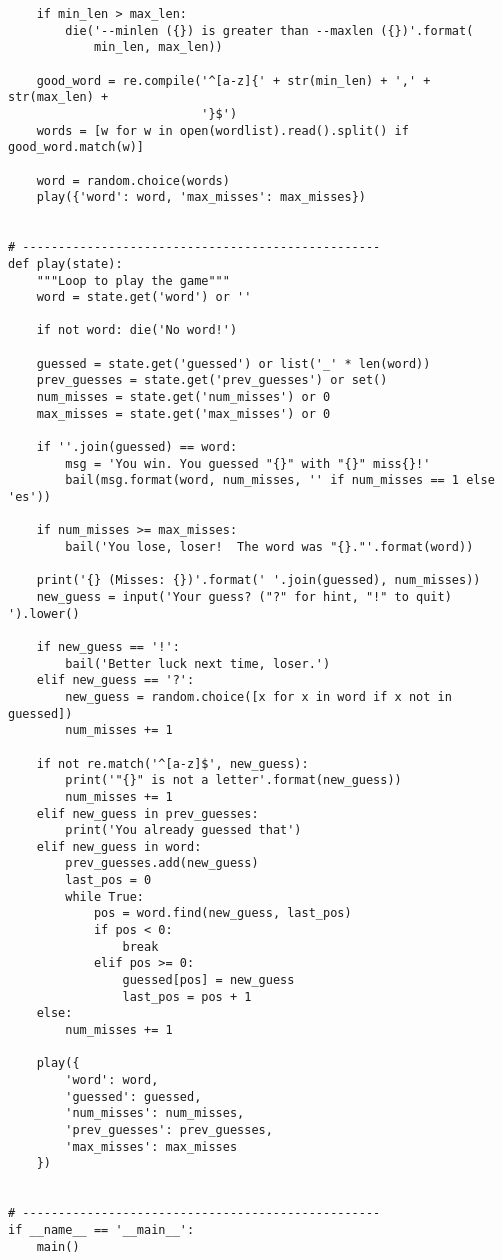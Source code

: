 \documentclass[]{article}
\begin{document}
\begin{verbatim}
    if min_len > max_len:
        die('--minlen ({}) is greater than --maxlen ({})'.format(
            min_len, max_len))

    good_word = re.compile('^[a-z]{' + str(min_len) + ',' + str(max_len) +
                           '}$')
    words = [w for w in open(wordlist).read().split() if good_word.match(w)]

    word = random.choice(words)
    play({'word': word, 'max_misses': max_misses})


# --------------------------------------------------
def play(state):
    """Loop to play the game"""
    word = state.get('word') or ''

    if not word: die('No word!')

    guessed = state.get('guessed') or list('_' * len(word))
    prev_guesses = state.get('prev_guesses') or set()
    num_misses = state.get('num_misses') or 0
    max_misses = state.get('max_misses') or 0

    if ''.join(guessed) == word:
        msg = 'You win. You guessed "{}" with "{}" miss{}!'
        bail(msg.format(word, num_misses, '' if num_misses == 1 else 'es'))

    if num_misses >= max_misses:
        bail('You lose, loser!  The word was "{}."'.format(word))

    print('{} (Misses: {})'.format(' '.join(guessed), num_misses))
    new_guess = input('Your guess? ("?" for hint, "!" to quit) ').lower()

    if new_guess == '!':
        bail('Better luck next time, loser.')
    elif new_guess == '?':
        new_guess = random.choice([x for x in word if x not in guessed])
        num_misses += 1

    if not re.match('^[a-z]$', new_guess):
        print('"{}" is not a letter'.format(new_guess))
        num_misses += 1
    elif new_guess in prev_guesses:
        print('You already guessed that')
    elif new_guess in word:
        prev_guesses.add(new_guess)
        last_pos = 0
        while True:
            pos = word.find(new_guess, last_pos)
            if pos < 0:
                break
            elif pos >= 0:
                guessed[pos] = new_guess
                last_pos = pos + 1
    else:
        num_misses += 1

    play({
        'word': word,
        'guessed': guessed,
        'num_misses': num_misses,
        'prev_guesses': prev_guesses,
        'max_misses': max_misses
    })


# --------------------------------------------------
if __name__ == '__main__':
    main()
\end{verbatim}
\end{document}
